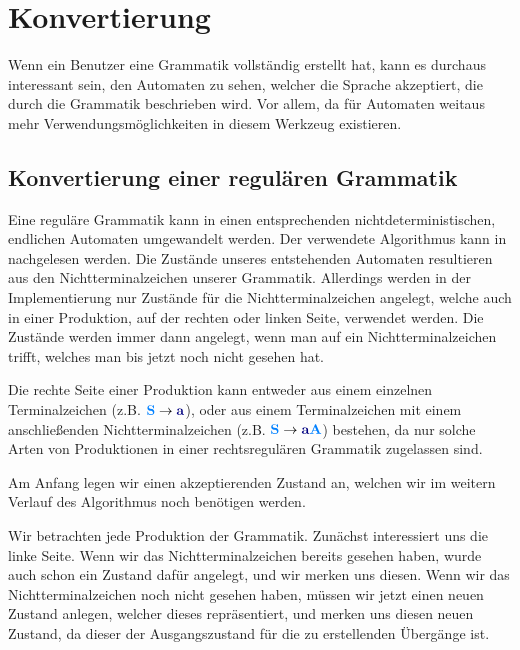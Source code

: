 \section{Konvertierung}\label{ConverToGrammar}

Wenn ein Benutzer eine Grammatik vollständig erstellt hat, kann es durchaus
interessant sein, den Automaten zu sehen, welcher die Sprache akzeptiert, die
durch die Grammatik beschrieben wird. Vor allem, da für Automaten weitaus mehr
Verwendungsmöglichkeiten in diesem Werkzeug existieren.\vspace{10pt}


\subsection{Konvertierung einer regulären Grammatik}\label{ConverToGrammarRegular}

Eine reguläre Grammatik kann in einen entsprechenden nichtdeterministischen,
endlichen Automaten umgewandelt werden. Der verwendete Algorithmus kann in
\cite{Compilers} nachgelesen werden. Die Zustände unseres entstehenden Automaten
resultieren aus den Nichtterminalzeichen unserer Grammatik. Allerdings werden in
der Implementierung nur Zustände für die Nichtterminalzeichen angelegt, welche
auch in einer Produktion, auf der rechten oder linken Seite, verwendet werden.
Die Zustände werden immer dann angelegt, wenn man auf ein Nichtterminalzeichen
trifft, welches man bis jetzt noch nicht gesehen hat.\vspace{10pt}

Die rechte Seite einer Produktion kann entweder aus einem einzelnen
Terminalzeichen (z.B. $\NonterminalSymbol{S} \to \TerminalSymbol{a}$), oder
aus einem Terminalzeichen mit einem anschließenden Nichtterminalzeichen
(z.B. $\NonterminalSymbol{S} \to \TerminalSymbol{a}\NonterminalSymbol{A}$)
bestehen, da nur solche Arten von Produktionen in einer rechtsregulären
Grammatik zugelassen sind.\vspace{10pt}

Am Anfang legen wir einen akzeptierenden Zustand an, welchen wir im weitern
Verlauf des Algorithmus noch benötigen werden.\vspace{10pt}

Wir betrachten jede Produktion der Grammatik. Zunächst interessiert uns die linke
Seite. Wenn wir das Nichtterminalzeichen bereits gesehen haben, wurde auch schon
ein Zustand dafür angelegt, und wir merken uns diesen. Wenn wir das
Nichtterminalzeichen noch nicht gesehen haben, müssen wir jetzt einen neuen
Zustand anlegen, welcher dieses repräsentiert, und merken uns diesen neuen
Zustand, da dieser der Ausgangszustand für die zu erstellenden Übergänge
ist.\vspace{10pt}

